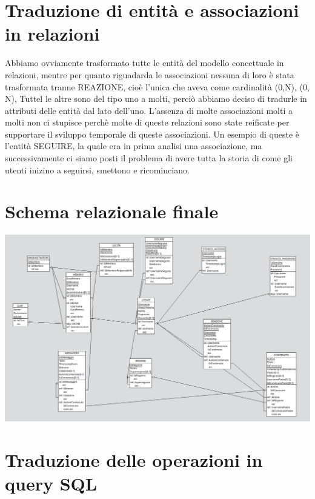 \documentclass[a4paper,12pt]{report}
\begin{document}
\section{Traduzione di entità e associazioni in relazioni}
Abbiamo ovviamente trasformato tutte le entità del modello concettuale in relazioni, mentre per quanto riguadarda le associazioni nessuna di loro è stata trasformata tranne REAZIONE, cioè l'unica che aveva come cardinalità (0,N), (0, N), Tuttel le altre sono del tipo uno a molti, perciò abbiamo deciso di tradurle in attributi delle entità dal lato dell'uno. L'assenza di molte associazioni molti a molti non ci stupisce perchè molte di queste relazioni sono state reificate per supportare il sviluppo temporale di queste associazioni. Un esempio di queste è l'entità SEGUIRE, la quale era in prima analisi una associazione, ma successivamente ci siamo posti il problema di avere tutta la storia di come gli utenti inizino a seguirsi, smettono e ricominciano.
\section{Schema relazionale finale}
\includegraphics[scale=0.6, angle=90]{./img/logico.png}
\section{Traduzione delle operazioni in query SQL}
\end{document}
